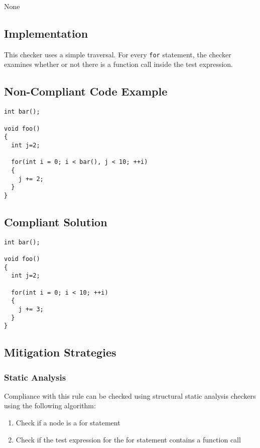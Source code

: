 None

\subsection{Implementation}

This checker uses a simple traversal. For every \texttt{for} statement, the checker examines whether or not there is a function call inside the test expression.

\subsection{Non-Compliant Code Example}


\begin{verbatim}
int bar();

void foo()
{
  int j=2;

  for(int i = 0; i < bar(), j < 10; ++i)
  {
    j += 2;
  }
}
\end{verbatim}

\subsection{Compliant Solution}


\begin{verbatim}
int bar();

void foo()
{
  int j=2;

  for(int i = 0; i < 10; ++i)
  {
    j += 3;
  }
}
\end{verbatim}

\subsection{Mitigation Strategies}
\subsubsection{Static Analysis} 

Compliance with this rule can be checked using structural static analysis checkers using the following algorithm:

\begin{enumerate}
\item Check if a node is a for statement
\item Check if the test expression for the for statement contains a function call
\end{enumerate}

